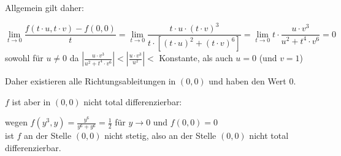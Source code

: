 \documentclass[ngerman, a4paper]{scrartcl}
\begin{document}
\begin{enumerate}[\textbf{\alph*)}]
		Allgemein gilt daher:
		
		\[
			\lim\limits_{t\rightarrow 0} \frac{f(t\cdot u, t\cdot v) - f(0,0)}{t} = 
			\lim\limits_{t \rightarrow 0}\frac{t\cdot u\cdot(t\cdot v)^3}{t\cdot \left[ (t\cdot u)^2 + (t\cdot v)^6\right]} = 
			\lim\limits_{t \rightarrow 0} t\cdot \frac{u\cdot v^3}{u^2 + t^4\cdot v^6} = 0
		\]
		sowohl für $u \ne 0$ da $\left|\tfrac{u\cdot v^3}{u^2 + t^4\cdot v^6}\right| < \left|\tfrac{u\cdot v^3}{u^2}\right| < $ Konstante, als auch $u = 0$ (und $v = 1$)
		
		Daher existieren alle Richtungsableitungen in $(0,0)$ und haben den Wert 0.
		
		$f$ ist aber in $(0,0)$ nicht total differenzierbar:
		
		
		wegen $f(y^3,y) = \frac{y^6}{y^6 + y^6} = \frac{1}{2}$ für $y \rightarrow 0$ und $f(0,0) = 0$\\
		ist $f$ an der Stelle $(0,0)$ nicht stetig, also an der Stelle $(0,0)$ nicht total differenzierbar.
	\end{enumerate}
\end{document}
